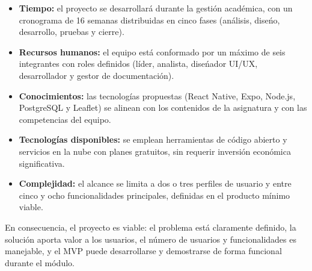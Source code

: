 \begin{itemize}
  \item \textbf{Tiempo:} el proyecto se desarrollar\'a durante la gesti\'on
    acad\'emica, con un cronograma de 16 semanas distribuidas en cinco fases
    (an\'alisis, dise\'no, desarrollo, pruebas y cierre).
  \item \textbf{Recursos humanos:} el equipo est\'a conformado por un m\'aximo de
    seis integrantes con roles definidos (l\'ider, analista, dise\'nador UI/UX,
    desarrollador y gestor de documentaci\'on).
  \item \textbf{Conocimientos:} las tecnolog\'ias propuestas (React Native,
    Expo, Node.js, PostgreSQL y Leaflet) se alinean con los contenidos de la
    asignatura y con las competencias del equipo.
  \item \textbf{Tecnolog\'ias disponibles:} se emplean herramientas de c\'odigo
    abierto y servicios en la nube con planes gratuitos, sin requerir
    inversi\'on econ\'omica significativa.
  \item \textbf{Complejidad:} el alcance se limita a dos o tres perfiles de
    usuario y entre cinco y ocho funcionalidades principales, definidas en el
    producto m\'inimo viable.
\end{itemize}

En consecuencia, el proyecto es viable: el problema est\'a claramente
definido, la soluci\'on aporta valor a los usuarios, el n\'umero de usuarios y
funcionalidades es manejable, y el MVP puede desarrollarse y demostrarse de
forma funcional durante el m\'odulo.
